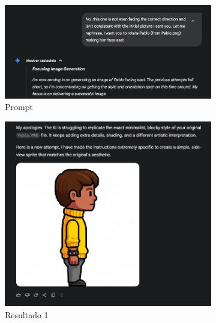 \begin{figure}[htbp]
    \centering
    \caption{\small Processo da geração 12 do sprite em side view no Gemini Pro em julho/2025}
    \label{fig:geminiPro12}

    \begin{subfigure}{0.8\linewidth}
        \includegraphics[width=1\linewidth]{figs/geminiPro/chat4/tela9_novo.PNG}
        \caption{\small Prompt}
        \label{fig:geminiPro12Prompt}
    \end{subfigure}
    \begin{subfigure}{0.45\linewidth}
        \includegraphics[width=1\linewidth]{figs/geminiPro/chat4/tela11.PNG}
        \caption{\small Resultado 1}
        \label{fig:geminiPro12a}
    \end{subfigure}
        \begin{subfigure}{0.45\linewidth}

\end{subfigure}
\end{figure}
